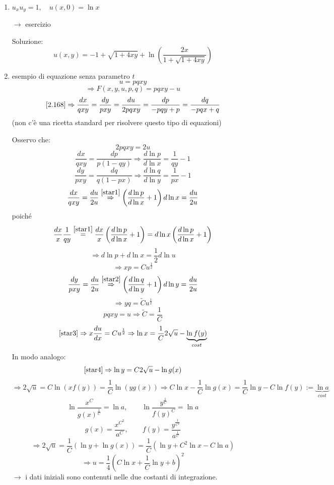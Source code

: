 \documentclass[a4paper,11pt]{report}
\begin{document}
\begin{enumerate}[label=(\roman*)]
\item $u_xu_y=1, \quad u(x,0)=\ln x$

$\rightarrow$ esercizio

Soluzione:
\[
u(x,y)=-1+\sqrt{1+4xy}+\ln \left(\frac{2x}{1+\sqrt{1+4xy}}\right)
\]

\item esempio di equazione senza parametro $t$
\[
u=pqxy
\]
\[
\Rightarrow F(x,y,u,p,q)=pqxy-u
\]
\[
\eqref{2.168}\Rightarrow \frac{dx}{qxy}=\frac{dy}{pxy} =\frac{du}{2pqxy}=\frac{dp}{-pqy+p}=\frac{dq}{-pqx+q}
\]
(non c'\`e una ricetta standard per risolvere questo tipo di equazioni)

Osservo che:
\[
2pqxy=2u
\]
\begin{equation}
\frac{dx}{qxy}=\frac{dp}{p(1-qy)}\Rightarrow \frac{d\ln p}{d\ln x}=\frac{1}{qy}-1
\label{star1}
\tag{$*$}
\end{equation}
\begin{equation}
\frac{dy}{pxy}=\frac{dq}{q(1-px)}\Rightarrow \frac{d \ln q}{d \ln y}=\frac{1}{px}-1
\label{star2}
\tag{$**$}
\end{equation}
\[
\frac{dx}{qxy}=\frac{du}{2u}\overset{\eqref{star1}}{\Rightarrow} \left(\frac{d\ln p}{d\ln x}+1\right)d\ln x = \frac{du}{2u}
\]
poich\'e
\[
\frac{dx}{x} \frac{1}{qy}\overset{\eqref{star1}}{=}\frac{dx}{x}\left(\frac{d\ln p}{d\ln x}+1\right)=d\ln x\left(\frac{d\ln p}{d\ln x}+1\right)
\]
\[
\Rightarrow d\ln p + d\ln x=\frac{1}{2}d\ln u
\]
\begin{equation}
\Rightarrow xp = Cu^{\frac{1}{2}} 
\label{star3}
\tag{$***$}
\end{equation}
\[
\frac{dy}{pxy}=\frac{du}{2u}\overset{\eqref{star2}}{\Rightarrow}\left(\frac{d\ln q}{d\ln y}+1\right)d\ln y=\frac{du}{2u}
\]
\begin{equation}
\Rightarrow yq=\tilde{C}u^{\frac{1}{2}}
\label{star4}
\tag{$***\,*$}
\end{equation}
\[
pqxy=u \Rightarrow \tilde{C}=\frac{1}{C}
\]
\[
\eqref{star3} \Rightarrow x\frac{d u}{d x}= Cu^{\frac{1}{2}} \Rightarrow \ln x=\frac{1}{C} 2 \sqrt{u}-\underbrace{\ln f(y)}_{cost}
\]
In modo analogo:
\[
\eqref{star4}\Rightarrow \ln y = C 2 \sqrt{u} - \ln g(x)
\]
\[
\Rightarrow 2\sqrt{u} = C\ln (xf(y)) = \frac{1}{C}\ln (yg(x)) \Rightarrow C \ln x - \frac{1}{C}\ln g(x) = \frac{1}{C}\ln y - C\ln f(y) :=\underbrace{\ln a}_{cost}
\]
\[
\ln \frac{x^C}{g(x)^\frac{1}{C}}=\ln a, \qquad \ln \frac{y^\frac{1}{C}}{f(y)^C} = \ln a
\]
\[
g(x)=\frac{x^{C^2}}{a^C}, \qquad f(y)=\frac{y^\frac{1}{C^2}}{a^\frac{1}{C}}
\]
\[
\Rightarrow 2\sqrt{u}=\frac{1}{C} (\ln y + \ln g(x)) = \frac{1}{C}(\ln y + C^2 \ln x - C \ln a)
\]
\[
\Rightarrow u=\frac{1}{4}\left(C\ln x + \frac{1}{C}\ln y + b\right)^2
\]
$\rightarrow$ i dati iniziali sono contenuti nelle due costanti di integrazione.
\end{enumerate}
\end{document}
